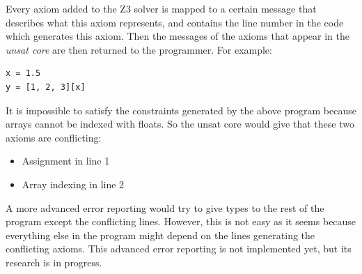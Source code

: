 Every axiom added to the Z3 solver is mapped to a certain message that describes what this axiom represents, and contains the line number in the code which generates this axiom. Then the messages of the axioms that appear in the \textit{unsat core} are then returned to the programmer. For example:
\begin{lstlisting}
x = 1.5
y = [1, 2, 3][x]
\end{lstlisting}

It is impossible to satisfy the constraints generated by the above program because arrays cannot be indexed with floats. So the unsat core would give that these two axioms are conflicting:
\begin{itemize}
	\item Assignment in line 1
	\item Array indexing in line 2
\end{itemize}

A more advanced error reporting would try to give types to the rest of the program except the conflicting lines. However, this is not easy as it seems because everything else in the program might depend on the lines generating the conflicting axioms. This advanced error reporting is not implemented yet, but its research is in progress.